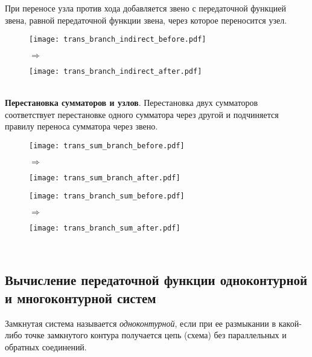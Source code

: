 \documentclass[../../TAU.tex]{subfiles}
\begin{document}
    При переносе узла против хода  добавляется звено с передаточной функцией звена, равной передаточной функции звена, через которое переносится узел. 
    \begin{figure}[h]
        \begin{minipage}[h]{0.45\linewidth}
            \texttt{[image: trans\_branch\_indirect\_before.pdf]}
        \end{minipage}
        $\Longrightarrow$
        \begin{minipage}[h]{0.45\linewidth}
            \texttt{[image: trans\_branch\_indirect\_after.pdf]}
        \end{minipage}
    \end{figure}\\
    {\bf Перестановка сумматоров и узлов}. Перестановка двух сумматоров соответствует перестановке одного сумматора через другой  и подчиняется правилу переноса сумматора через звено.
    \begin{figure}[h]
        \begin{minipage}[h]{0.45\linewidth}
            \texttt{[image: trans\_sum\_branch\_before.pdf]}
        \end{minipage}
        $\Longrightarrow$
        \begin{minipage}[h]{0.45\linewidth}
            \texttt{[image: trans\_sum\_branch\_after.pdf]}
        \end{minipage}
    \end{figure}
    \begin{figure}[h]
        \begin{minipage}[h]{0.45\linewidth}
            \texttt{[image: trans\_branch\_sum\_before.pdf]}
        \end{minipage}
    $\Longrightarrow$
        \begin{minipage}[h]{0.45\linewidth}
            \texttt{[image: trans\_branch\_sum\_after.pdf]}
        \end{minipage}
    \end{figure}\\

\subsection{Вычисление передаточной функции одноконтурной и многоконтурной систем}

     Замкнутая система называется {\it одноконтурной}, если при ее размыкании в какой-либо точке замкнутого контура получается цепь (схема) без параллельных и обратных соединений.
\end{document}

